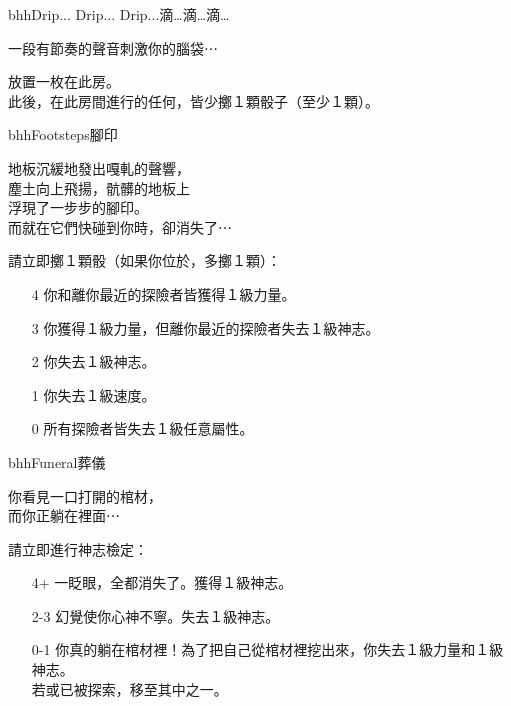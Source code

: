 \linebreak[0]%
\begin{EventCard}{bhh}{Drip... Drip... Drip...}{滴…滴…滴…}
  \begin{CardStory}
    一段有節奏的聲音刺激你的腦袋⋯
  \end{CardStory}
  放置一枚在此房。\\[0.5em]
  此後，在此房間進行的任何，皆少擲１顆骰子（至少１顆）。\\[0.5em]
\end{EventCard}%
\linebreak[0]%
\begin{EventCard}{bhh}{Footsteps}{腳印}
  \begin{CardStory}
    地板沉緩地發出嘎軋的聲響，\\
    塵土向上飛揚，骯髒的地板上\\
    浮現了一步步的腳印。\\
    而就在它們快碰到你時，卻消失了⋯
  \end{CardStory}
  請立即擲１顆骰（如果你位於，多擲１顆）：
  \begin{itemize}
    \item[4] 你和離你最近的探險者皆獲得１級力量。
    \item[3] 你獲得１級力量，但離你最近的探險者失去１級神志。
    \item[2] 你失去１級神志。
    \item[1] 你失去１級速度。
    \item[0] 所有探險者皆失去１級任意屬性。
  \end{itemize}
\end{EventCard}%
\linebreak[0]%
\begin{EventCard}{bhh}{Funeral}{葬儀}
  \begin{CardStory}
    你看見一口打開的棺材，\\
    而你正躺在裡面⋯
  \end{CardStory}
  請立即進行神志檢定：
  \begin{itemize}
    \item[4+] 一眨眼，全都消失了。獲得１級神志。
    \item[2-3] 幻覺使你心神不寧。失去１級神志。
    \item[0-1] 你真的躺在棺材裡！為了把自己從棺材裡挖出來，你失去１級力量和１級神志。\\
               若或已被探索，移至其中之一。
  \end{itemize}
\end{EventCard}%
